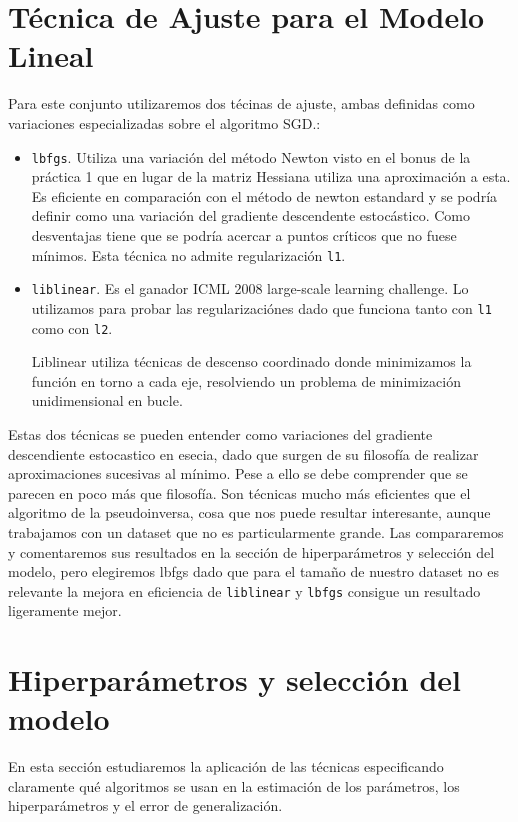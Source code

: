 \documentclass[11pt,a4paper]{article}
\begin{document}
\section{ Técnica de Ajuste para el Modelo Lineal}
Para este conjunto utilizaremos dos técinas de ajuste, ambas definidas como variaciones especializadas sobre el algoritmo SGD.:
\begin{itemize}
	\item \texttt{lbfgs}. Utiliza una variación del método Newton visto en el bonus de la práctica 1 que en lugar de la matriz Hessiana utiliza una aproximación a esta. Es eficiente en comparación con el método de newton estandard y se podría definir como una variación del gradiente descendente estocástico. Como desventajas tiene que se podría acercar a puntos críticos que no fuese mínimos. Esta técnica no admite regularización \texttt{l1}.
	\item \texttt{liblinear}. Es el ganador ICML 2008 large-scale learning challenge. Lo utilizamos para probar las regularizaciónes dado que funciona tanto con \texttt{l1} como con \texttt{l2}.
	
	Liblinear utiliza técnicas de descenso coordinado\cite{CD} donde minimizamos la función en torno a cada eje, resolviendo un problema de minimización unidimensional en bucle. 
\end{itemize}

Estas dos técnicas se pueden entender como variaciones del gradiente descendiente estocastico en esecia, dado que surgen de su filosofía de realizar aproximaciones sucesivas al mínimo. Pese a ello se debe comprender que se parecen en poco más que filosofía. Son técnicas mucho más eficientes que el algoritmo de la pseudoinversa, cosa que nos puede resultar interesante, aunque trabajamos con un dataset que no es particularmente grande. Las compararemos y comentaremos sus resultados  en la sección de hiperparámetros y selección del modelo, pero elegiremos lbfgs dado que para el tamaño de nuestro dataset no es relevante la mejora en eficiencia de \texttt{liblinear} y \texttt{lbfgs} consigue un resultado ligeramente mejor.


\section{Hiperparámetros y selección del modelo}
 En esta sección estudiaremos la aplicación de las técnicas especificando claramente qué algoritmos se usan en la estimación de los parámetros, los hiperparámetros y el error de generalización.
 
\end{document}

